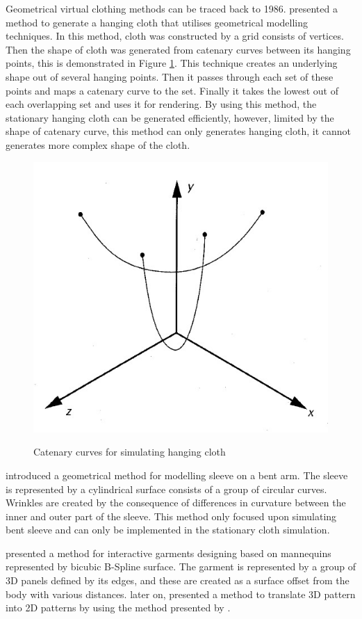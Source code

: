 Geometrical virtual clothing methods can be traced back to 1986.  presented a method to generate a hanging cloth that utilises geometrical modelling techniques. In this method, cloth was constructed by a grid consists of vertices. Then the shape of cloth was generated from catenary curves between its hanging points, this is demonstrated in Figure \ref{figure:weil}.  This technique creates an underlying shape out of several hanging points. Then it passes through each set of these points and maps a catenary curve to the set. Finally it takes the lowest out of each overlapping set and uses it for rendering. By using this method, the stationary hanging cloth can be generated efficiently, however, limited by the shape of catenary curve, this method can only generates hanging cloth, it cannot generates more complex shape of the cloth.

\begin{figure}[ht]
    \centering
	\includegraphics[width=0.7\columnwidth]{../images/weil1986}\\[1cm]
    \caption{Catenary curves for simulating hanging cloth}
    \label{figure:weil}
\end{figure}

 introduced a geometrical method for modelling sleeve on a bent arm. The sleeve is represented by a cylindrical surface consists of a group of circular curves. Wrinkles are created by the consequence of differences in curvature between the inner and outer part of the sleeve. This method only focused upon simulating bent sleeve and can only be implemented in the stationary cloth simulation. 

 presented a method for interactive garments designing based on mannequins represented by bicubic B-Spline surface. The garment is represented by a group of 3D panels defined by its edges, and these are created as a surface offset from the body with various distances. later on,  presented a method to translate 3D pattern into 2D patterns by using the method presented by . 

